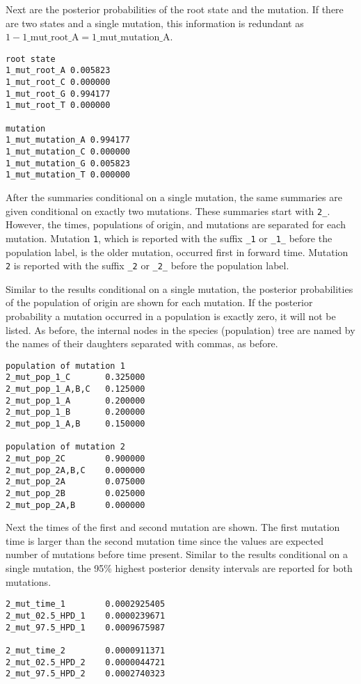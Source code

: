 \documentclass[11pt]{article}
\begin{document}
Next are the posterior probabilities of the root state and the mutation. 
If there are two states and a single mutation, this information is redundant as $1 - \text{1\_mut\_root\_A} = \text{1\_mut\_mutation\_A}$.
\begin{Verbatim}[frame=single, fontsize=\small]
root state
1_mut_root_A 0.005823	
1_mut_root_C 0.000000	
1_mut_root_G 0.994177	
1_mut_root_T 0.000000	

mutation
1_mut_mutation_A 0.994177	
1_mut_mutation_C 0.000000	
1_mut_mutation_G 0.005823	
1_mut_mutation_T 0.000000
\end{Verbatim}

After the summaries conditional on a single mutation, the same summaries are given conditional on exactly two mutations. 
These summaries start with \texttt{2\_}. 
However, the times, populations of origin, and mutations are separated for each mutation. 
Mutation \texttt{1}, which is reported with the suffix \texttt{\_1} or \texttt{\_1\_} before the population label, is the older mutation, occurred first in forward time.
Mutation \texttt{2} is reported with the suffix \texttt{\_2} or \texttt{\_2\_} before the population label.

Similar to the results conditional on a single mutation, the posterior probabilities of the population of origin are shown for each mutation. 
If the posterior probability a mutation occurred in a population is exactly zero, it will not be listed. 
As before, the internal nodes in the species (population) tree are named by the names of their daughters separated with commas, as before.
\begin{Verbatim}[frame=single, fontsize=\small]
population of mutation 1
2_mut_pop_1_C    	0.325000	
2_mut_pop_1_A,B,C	0.125000	
2_mut_pop_1_A    	0.200000	
2_mut_pop_1_B    	0.200000	
2_mut_pop_1_A,B  	0.150000	

population of mutation 2
2_mut_pop_2C    	0.900000	
2_mut_pop_2A,B,C	0.000000	
2_mut_pop_2A    	0.075000	
2_mut_pop_2B    	0.025000	
2_mut_pop_2A,B  	0.000000	
\end{Verbatim}

Next the times of the first and second mutation are shown.
The first mutation time is larger than the second mutation time since the values are expected number of mutations before time present.
Similar to the results conditional on a single mutation, the 95\% highest posterior density intervals are reported for both mutations.
\begin{Verbatim}[frame=single, fontsize=\small]
2_mut_time_1    	0.0002925405	
2_mut_02.5_HPD_1	0.0000239671
2_mut_97.5_HPD_1	0.0009675987	

2_mut_time_2    	0.0000911371	
2_mut_02.5_HPD_2	0.0000044721	
2_mut_97.5_HPD_2	0.0002740323
\end{Verbatim}
\end{document}
